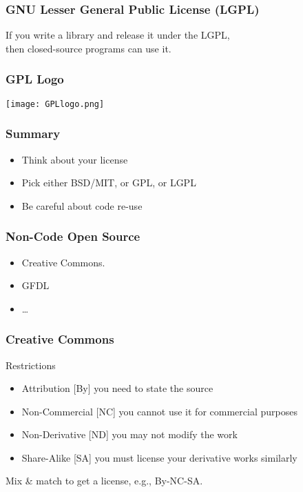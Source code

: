 \begin{frame}[fragile]
\frametitle{GNU Lesser General Public License (LGPL)}

If you write a library and release it under the LGPL,\\
then closed-source programs can use it.

\end{frame}

\begin{frame}[fragile]
\frametitle{GPL Logo}

\centering
\texttt{[image: GPLlogo.png]}

\end{frame}

\begin{frame}[fragile]
\frametitle{Summary}

\begin{itemize}
\item Think about your license
\item Pick either BSD/MIT, or GPL, or LGPL
\item Be careful about code re-use
\end{itemize}
\end{frame}

\begin{frame}[fragile]
\frametitle{Non-Code Open Source}

\begin{itemize}
\item Creative Commons.
\item GFDL
\item \ldots
\end{itemize}
\end{frame}

\begin{frame}[fragile]
\frametitle{Creative Commons}

\begin{block}{Restrictions}
\begin{itemize}
\item \alert{Attribution} [By] you need to state the source
\item \alert{Non-Commercial} [NC] you cannot use it for commercial purposes
\item \alert{Non-Derivative} [ND] you may not modify the work
\item \alert{Share-Alike} [SA] you must license your derivative works similarly
\end{itemize}
\end{block}

Mix \& match to get a license, e.g., By-NC-SA.
\end{frame}

